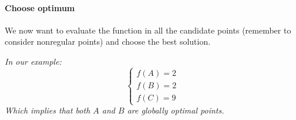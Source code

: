 \paragraph{Choose optimum} We now want to evaluate the function in all the candidate points (remember to consider nonregular points) and choose the best solution.

\textit{In our example:
$$
\begin{cases}
	f(A) = 2 \\
	f(B) = 2 \\
	f(C) = 9
\end{cases}
$$
Which implies that both $A$ and $B$ are globally optimal points.}